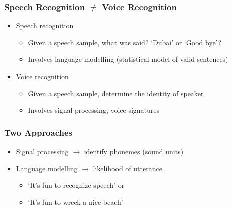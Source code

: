 \begin{frame}
\frametitle{Speech Recognition $\neq$ Voice Recognition}
\begin{itemize}[<+->]
\item Speech recognition
	\begin{itemize}
	\item Given a speech sample, what was said? `Dubai' or `Good bye'?
	\item Involves language modelling (statistical model of valid sentences)
	\end{itemize}
\item Voice recognition
	\begin{itemize}
	\item Given a speech sample, determine the identity of speaker
	\item Involves signal processing, voice signatures
	\end{itemize}
\end{itemize}
\end{frame}

\begin{frame}
\frametitle{Two Approaches} 
\begin{itemize}
\item Signal processing $\longrightarrow$ identify phonemes (sound units)
\item Language modelling $\longrightarrow$ likelihood of utterance
	\begin{itemize}
	\item `It's fun to recognize speech' or
	\item `It's fun to wreck a nice beach'
	\end{itemize}
\end{itemize}
\end{frame}